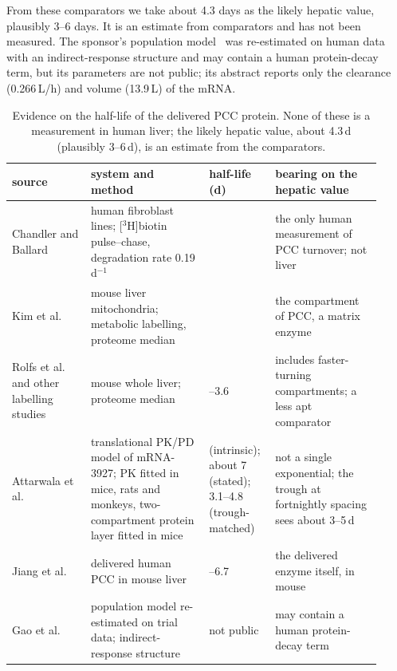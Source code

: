 From these comparators we take about 4.3 days as the likely hepatic value, plausibly 3--6
days. It is an estimate from comparators and has not been measured. The sponsor's population model~\cite{gao2025acop} was re-estimated
on human data with an indirect-response structure and may contain a human protein-decay term,
but its parameters are not public; its abstract reports only the clearance (0.266\,L/h) and
volume (13.9\,L) of the mRNA.

\begin{table}[tbp]
\centering
\footnotesize
\caption{\label{stab:s6-halflife}Evidence on the half-life of the delivered PCC protein. None
of these is a measurement in human liver; the likely hepatic value, about 4.3\,d (plausibly
3--6\,d), is an estimate from the comparators.}
\begin{tabular}{@{}>{\raggedright\arraybackslash}p{0.2\linewidth}>{\raggedright\arraybackslash}p{0.3\linewidth}>{\raggedright\arraybackslash}p{0.15\linewidth}>{\raggedright\arraybackslash}p{0.27\linewidth}@{}}
\toprule
source & system and method & half-life (d) & bearing on the hepatic value \\
\midrule
Chandler and Ballard~\cite{chandler1985} & human fibroblast lines; [$^{3}$H]biotin pulse--chase,
degradation rate 0.19\,d$^{-1}$ & 3.6 & the only human measurement of PCC turnover; not liver \\
Kim et al.~\cite{kim2012} & mouse liver mitochondria; metabolic labelling, proteome median &
4.26 & the compartment of PCC, a matrix enzyme \\
Rolfs et al.~\cite{rolfs2021} and other labelling studies & mouse whole liver; proteome median &
2.4--3.6 & includes faster-turning compartments; a less apt comparator \\
Attarwala et al.~\cite{pkpd_translational} & translational PK/PD model of mRNA-3927; PK fitted
in mice, rats and monkeys, two-compartment protein layer fitted in mice & 3.8 (intrinsic); about
7 (stated); 3.1--4.8 (trough-matched) & not a single exponential; the trough at fortnightly
spacing sees about 3--5\,d \\
Jiang et al.~\cite{jiang2020dual} & delivered human PCC in mouse liver & 5.3--6.7 & the delivered
enzyme itself, in mouse \\
Gao et al.~\cite{gao2025acop} & population model re-estimated on trial data; indirect-response
structure & not public & may contain a human protein-decay term \\
\bottomrule
\end{tabular}
\end{table}


